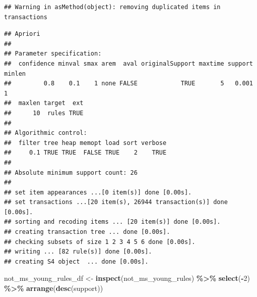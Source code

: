 \documentclass[
]{article}
\newenvironment{Shaded}{\begin{snugshade}}{\end{snugshade}}
\newcommand{\AttributeTok}[1]{\textcolor[rgb]{0.13,0.29,0.53}{#1}}
\newcommand{\CommentTok}[1]{\textcolor[rgb]{0.56,0.35,0.01}{\textit{#1}}}
\newcommand{\DecValTok}[1]{\textcolor[rgb]{0.00,0.00,0.81}{#1}}
\newcommand{\FloatTok}[1]{\textcolor[rgb]{0.00,0.00,0.81}{#1}}
\newcommand{\FunctionTok}[1]{\textcolor[rgb]{0.13,0.29,0.53}{\textbf{#1}}}
\newcommand{\NormalTok}[1]{#1}
\newcommand{\OtherTok}[1]{\textcolor[rgb]{0.56,0.35,0.01}{#1}}
\newcommand{\SpecialCharTok}[1]{\textcolor[rgb]{0.81,0.36,0.00}{\textbf{#1}}}
\begin{document}
\begin{Shaded}
\end{Shaded}

\begin{verbatim}
## Warning in asMethod(object): removing duplicated items in transactions
\end{verbatim}

\begin{verbatim}
## Apriori
## 
## Parameter specification:
##  confidence minval smax arem  aval originalSupport maxtime support minlen
##         0.8    0.1    1 none FALSE            TRUE       5   0.001      1
##  maxlen target  ext
##      10  rules TRUE
## 
## Algorithmic control:
##  filter tree heap memopt load sort verbose
##     0.1 TRUE TRUE  FALSE TRUE    2    TRUE
## 
## Absolute minimum support count: 26 
## 
## set item appearances ...[0 item(s)] done [0.00s].
## set transactions ...[20 item(s), 26944 transaction(s)] done [0.00s].
## sorting and recoding items ... [20 item(s)] done [0.00s].
## creating transaction tree ... done [0.00s].
## checking subsets of size 1 2 3 4 5 6 done [0.00s].
## writing ... [82 rule(s)] done [0.00s].
## creating S4 object  ... done [0.00s].
\end{verbatim}

\begin{Shaded}
\begin{Highlighting}[]
\NormalTok{not\_ms\_young\_rules\_df }\OtherTok{\textless{}{-}} \FunctionTok{inspect}\NormalTok{(not\_ms\_young\_rules) }\SpecialCharTok{\%\textgreater{}\%} \FunctionTok{select}\NormalTok{(}\SpecialCharTok{{-}}\DecValTok{2}\NormalTok{) }\SpecialCharTok{\%\textgreater{}\%} \FunctionTok{arrange}\NormalTok{(}\FunctionTok{desc}\NormalTok{(support))}
\end{Highlighting}
\end{Shaded}
\end{document}
